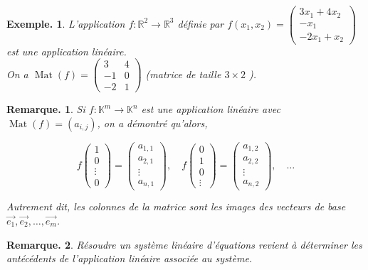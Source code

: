 \documentclass[12pt]{article}
\theoremstyle{break}
\newtheorem*{example}{Exemple.}
\newtheorem*{remark}{Remarque.}
\begin{document}
\begin{example}
L'application $f: \mathbb{R}^{2} \longrightarrow \mathbb{R}^{3}$ définie par $f\left(x_{1}, x_{2}\right)=\left(\begin{array}{c}3 x_{1}+4 x_{2} \\ -x_{1} \\ -2 x_{1}+x_{2}\end{array}\right)$ est une application linéaire.\\
On a $\operatorname{Mat}(f)=\left(\begin{array}{cc}3 & 4 \\ -1 & 0 \\ -2 & 1\end{array}\right)$ (matrice de taille $3 \times 2$ ).
\end{example}

\begin{remark}
Si $f: \mathbb{K}^{m} \longrightarrow \mathbb{K}^{n}$ est une application linéaire avec $\operatorname{Mat}(f)=\left(a_{i, j}\right)$, on a démontré qu'alors,

$$
f\left(\begin{array}{c}
1 \\
0 \\
\vdots \\
0
\end{array}\right)=\left(\begin{array}{c}
a_{1,1} \\
a_{2,1} \\
\vdots \\
a_{n, 1}
\end{array}\right), \quad f\left(\begin{array}{c}
0 \\
1 \\
0 \\
\vdots
\end{array}\right)=\left(\begin{array}{c}
a_{1,2} \\
a_{2,2} \\
\vdots \\
a_{n, 2}
\end{array}\right), \quad \ldots
$$

Autrement dit, les colonnes de la matrice sont les images des vecteurs de base $\overrightarrow{e_{1}}, \overrightarrow{e_{2}}, \ldots, \overrightarrow{e_{m}}$.
\end{remark}

\begin{remark}
Résoudre un système linéaire d'équations revient à déterminer les antécédents de l'application linéaire associée au système.
\end{remark}
\end{document}
